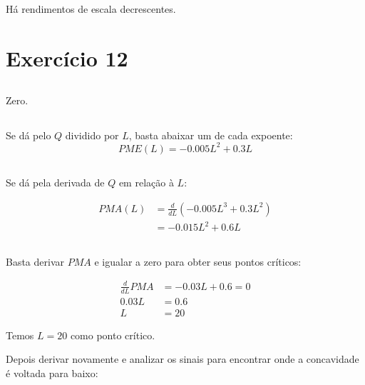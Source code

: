 \documentclass{article}
\begin{document}
\subsection{}

Há rendimentos de escala decrescentes.

\section{Exercício 12}

\subsection{}

Zero.

\subsection{}

Se dá pelo \(Q\) dividido por \(L\), basta abaixar um de cada expoente:
\[
	PME(L) = -0.005L^2 + 0.3L
\]

\subsection{}

Se dá pela derivada de \(Q\) em relação à \(L\):

\[
	\begin{aligned}
		PMA(L) & = \frac{d}{dL}(-0.005L^3 + 0.3L^2) \\
		       & = -0.015L^2 + 0.6L
	\end{aligned}
\]


\subsection{}

Basta derivar \(PMA\) e igualar a zero para obter seus pontos críticos:

\[
	\begin{aligned}
		\frac{d}{dL}PMA & = - 0.03L + 0.6 = 0 \\
		0.03L           & = 0.6               \\
		L               & = 20
	\end{aligned}
\]

Temos \(L = 20 \) como ponto crítico.

Depois derivar novamente e analizar os sinais para encontrar onde a concavidade
é voltada para baixo:
\end{document}
